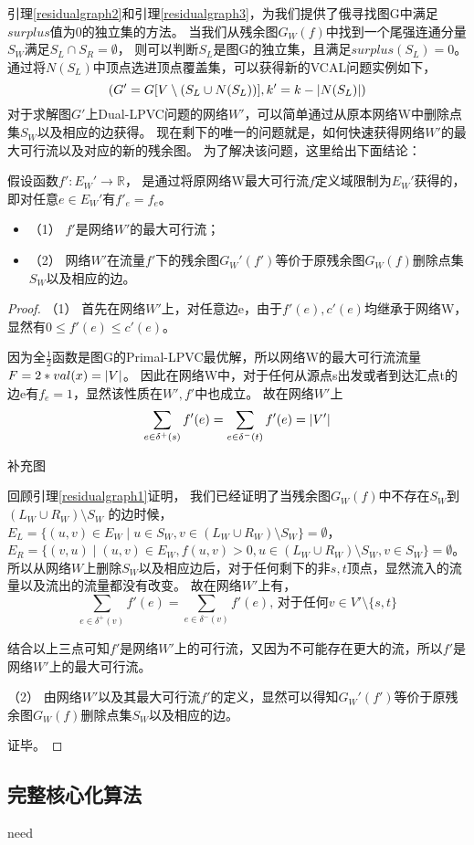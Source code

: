 引理\ref{residualgraph2}和引理\ref{residualgraph3}，为我们提供了俄寻找图G中满足$surplus$值为0的独立集的方法。
当我们从残余图$G_W(f)$中找到一个尾强连通分量$S_W$满足$S_L \cap S_R = \emptyset$，
则可以判断$S_L$是图G的独立集，且满足$surplus(S_L) = 0$。
通过将$N(S_L)$中顶点选进顶点覆盖集，可以获得新的VCAL问题实例如下，
\[(G' = G[V \setminus (S_L \cup N(S_L))], k' = k - \left\vert N(S_L) \right\vert)\]
对于求解图$G'$上Dual-LPVC问题的网络$W'$，可以简单通过从原本网络W中删除点集$S_W$以及相应的边获得。
现在剩下的唯一的问题就是，如何快速获得网络$W'$的最大可行流以及对应的新的残余图。
为了解决该问题，这里给出下面结论：
\begin{claim}
假设函数$f':E_W' \rightarrow \mathbb{R}$， 是通过将原网络W最大可行流$f$定义域限制为$E_W'$获得的，
即对任意$e \in E_W'$有$f'_e = f_e$。
\begin{itemize}
  \item {（1）} $f'$是网络$W'$的最大可行流；
  \item {（2）} 网络$W'$在流量$f'$下的残余图$G_W'(f')$等价于原残余图$G_W(f)$删除点集$S_W$以及相应的边。
\end{itemize}
\end{claim}
\begin{proof}

（1）
首先在网络$W'$上，对任意边e，由于$f'(e), c'(e)$均继承于网络W，显然有$0 \le f'(e) \le c'(e)$。

因为全$\frac{1}{2}$函数是图G的Primal-LPVC最优解，所以网络W的最大可行流流量$F = 2 * val(x) = \left\vert V \right\vert$。
因此在网络W中，对于任何从源点s出发或者到达汇点t的边e有$f_e = 1$，显然该性质在$W', f'$中也成立。
故在网络$W'$上
\begin{equation*}
    \sum_{e\in \delta^+(s)}{f'(e)} =\sum_{e\in \delta^-(t)}{f'(e)} = \left\vert V' \right\vert
\end{equation*}

\textcolor[rgb]{1.00,0.00,0.00}{补充图}

回顾引理\ref{residualgraph1}证明，
我们已经证明了当残余图$G_W(f)$中不存在$S_W$到$(L_W \cup R_W) \setminus S_W$ 的边时候，
$E_L = \{(u, v) \in E_W\;|\;u \in S_W,v \in (L_W \cup R_W) \setminus S_W\}=\emptyset$，
$E_R = \{(v, u)\;|\;(u, v) \in E_W,f(u, v) > 0,u \in (L_W \cup R_W) \setminus S_W,v \in S_W\}=\emptyset$。
所以从网络$W$上删除$S_W$以及相应边后，对于任何剩下的非$s, t$顶点，显然流入的流量以及流出的流量都没有改变。
故在网络$W'$上有，
\begin{equation*}
    \sum_{e\in \delta^+(v)}{f'(e)}=\sum_{e\in \delta^-(v)}{f'(e)}\mbox{, 对于任何} v \in V' \setminus \{s, t\}
\end{equation*}

结合以上三点可知$f'$是网络$W'$上的可行流，又因为不可能存在更大的流，所以$f'$是网络$W'$上的最大可行流。

（2）
由网络$W'$以及其最大可行流$f'$的定义，显然可以得知$G_W'(f')$等价于原残余图$G_W(f)$删除点集$S_W$以及相应的边。

证毕。
\end{proof}

\subsection{完整核心化算法}
\textcolor[rgb]{1.00,0.00,0.00}{need} 